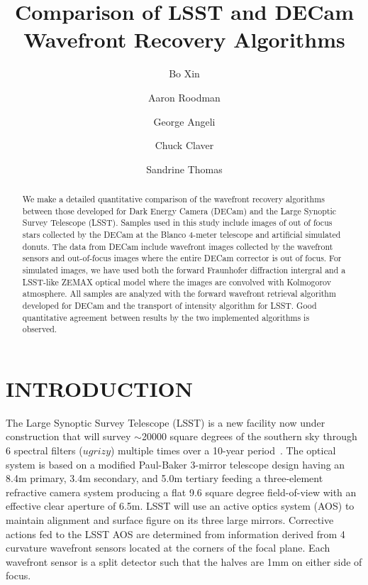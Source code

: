 \documentclass[]{spie}  %
\title{Comparison of LSST and DECam Wavefront Recovery Algorithms}
\author[a]{Bo Xin}
\author[b]{Aaron Roodman}
\author[a]{George Angeli}
\author[a]{Chuck Claver}
\author[a]{Sandrine Thomas}
\affil[a]{Large Synoptic Survey Telescope, Tucson AZ, USA}
\affil[b]{SLAC National Accelerator Laboratory, Stanford University, Menlo Park CA, USA}
\begin{document}
 
\maketitle

\begin{abstract}
We make a detailed quantitative comparison of the wavefront recovery algorithms between those developed for Dark Energy Camera (DECam) and the Large Synoptic Survey Telescope (LSST).
Samples used in this study include images of out of focus stars collected by the DECam at the Blanco 4-meter telescope and artificial simulated donuts. The data from DECam include wavefront images collected by the wavefront sensors and out-of-focus images where the entire DECam corrector is out of focus. For simulated images, we have used both the forward Fraunhofer diffraction intergral and a LSST-like ZEMAX optical model where the images are convolved with Kolmogorov atmosphere.
All samples are analyzed with the forward wavefront retrieval algorithm developed for DECam and the transport of intensity algorithm for LSST.  Good quantitative agreement between results by the two implemented algorithms is observed.
\end{abstract}


\section{INTRODUCTION}
\label{sec:intro}  %
The Large Synoptic Survey Telescope (LSST) is a new facility now under
construction that will survey $\sim$20000 square degrees of the
southern sky through 6 spectral filters ($ugrizy$) multiple times over
a 10-year period~\cite{KahnSPIE, Ivezic08}.
The optical system is
based on a modified Paul-Baker 3-mirror
telescope design having an 8.4m primary, 3.4m secondary, and 5.0m
tertiary feeding a three-element refractive camera system producing a
flat 9.6 square degree field-of-view with an effective clear aperture of
6.5m. 
LSST will use an active optics
system (AOS) to maintain alignment and surface figure on its
three large mirrors. Corrective actions fed to the LSST AOS are
determined from information derived from 4 curvature wavefront sensors located at the
corners of the focal plane. Each wavefront sensor is a split detector such that the halves
are 1mm on either side of focus. 
\end{document}
